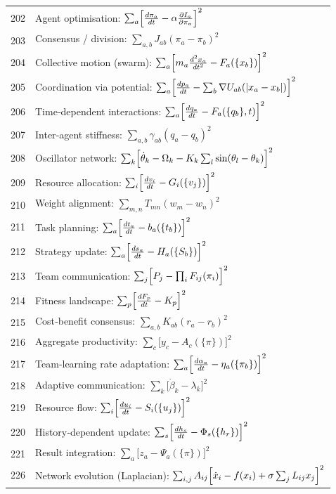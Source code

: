 \documentclass[12pt,a4paper]{article}
\begin{document}
\begin{longtable}{r l}
		202 & Agent optimisation: $\sum_a\Bigl[\frac{d\pi_a}{dt} - \alpha\frac{\partial I_a}{\partial\pi_a}\Bigr]^2$ \\
		203 & Consensus / division: $\sum_{a,b}J_{ab}(\pi_a - \pi_b)^2$ \\
		204 & Collective motion (swarm): $\sum_a\Bigl[m_a\frac{d^2 x_a}{dt^2} - F_a(\{x_b\})\Bigr]^2$ \\
		205 & Coordination via potential: $\sum_a\Bigl[\frac{dp_a}{dt} - \sum_b\nabla U_{ab}(|x_a-x_b|)\Bigr]^2$ \\
		206 & Time‑dependent interactions: $\sum_a\Bigl[\frac{dq_a}{dt} - F_a(\{q_b\},t)\Bigr]^2$ \\
		207 & Inter‑agent stiffness: $\sum_{a,b}\gamma_{ab}(q_a - q_b)^2$ \\
		208 & Oscillator network: $\sum_k\Bigl[\dot\theta_k - \Omega_k - K_k\sum_l\sin(\theta_l-\theta_k)\Bigr]^2$ \\
		209 & Resource allocation: $\sum_i\Bigl[\frac{dv_i}{dt} - G_i(\{v_j\})\Bigr]^2$ \\
		210 & Weight alignment: $\sum_{m,n}T_{mn}(w_m - w_n)^2$ \\
		211 & Task planning: $\sum_a\Bigl[\frac{dt_a}{dt} - b_a(\{t_b\})\Bigr]^2$ \\
		212 & Strategy update: $\sum_a\Bigl[\frac{ds_a}{dt} - H_a(\{S_b\})\Bigr]^2$ \\
		213 & Team communication: $\sum_j\Bigl[P_j - \prod_i F_{ij}(\pi_i)\Bigr]^2$ \\
		214 & Fitness landscape: $\sum_p\Bigl[\frac{dF_p}{dt} - K_p\Bigr]^2$ \\
		215 & Cost‑benefit consensus: $\sum_{a,b}K_{ab}(r_a - r_b)^2$ \\
		216 & Aggregate productivity: $\sum_c\bigl[y_c - A_c(\{\pi\})\bigr]^2$ \\
		217 & Team‑learning rate adaptation: $\sum_a\Bigl[\frac{d\alpha_a}{dt} - \eta_a(\{\pi_b\})\Bigr]^2$ \\
		218 & Adaptive communication: $\sum_k\bigl[\dot\beta_k - \lambda_k\bigr]^2$ \\
		219 & Resource flow: $\sum_i\Bigl[\frac{du_i}{dt} - S_i(\{u_j\})\Bigr]^2$ \\
		220 & History‑dependent update: $\sum_s\Bigl[\frac{dh_s}{dt} - \Phi_s(\{h_r\})\Bigr]^2$ \\
		221 & Result integration: $\sum_a\bigl[z_a - \Psi_a(\{\pi\})\bigr]^2$ \\
		226 & Network evolution (Laplacian): $\sum_{i,j}A_{ij}\Bigl[\dot x_i - f(x_i) + \sigma\sum_j L_{ij}x_j\Bigr]^2$ \\

\end{longtable}
\end{document}
